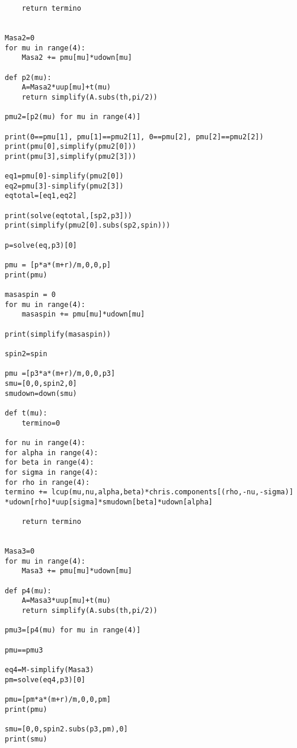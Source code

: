 \begin{verbatim}
    return termino
                        

Masa2=0
for mu in range(4):
    Masa2 += pmu[mu]*udown[mu]

def p2(mu):
    A=Masa2*uup[mu]+t(mu)
    return simplify(A.subs(th,pi/2))

pmu2=[p2(mu) for mu in range(4)]

print(0==pmu[1], pmu[1]==pmu2[1], 0==pmu[2], pmu[2]==pmu2[2])
print(pmu[0],simplify(pmu2[0]))
print(pmu[3],simplify(pmu2[3]))

eq1=pmu[0]-simplify(pmu2[0])
eq2=pmu[3]-simplify(pmu2[3])
eqtotal=[eq1,eq2]

print(solve(eqtotal,[sp2,p3]))
print(simplify(pmu2[0].subs(sp2,spin)))

p=solve(eq,p3)[0]

pmu = [p*a*(m+r)/m,0,0,p]
print(pmu)

masaspin = 0
for mu in range(4):
    masaspin += pmu[mu]*udown[mu]
    
print(simplify(masaspin))

spin2=spin

pmu =[p3*a*(m+r)/m,0,0,p3]
smu=[0,0,spin2,0]
smudown=down(smu)

def t(mu):
    termino=0
    
for nu in range(4):
for alpha in range(4):
for beta in range(4):
for sigma in range(4):
for rho in range(4):
termino += lcup(mu,nu,alpha,beta)*chris.components[(rho,-nu,-sigma)]
*udown[rho]*uup[sigma]*smudown[beta]*udown[alpha]
                        
    return termino
                        

Masa3=0
for mu in range(4):
    Masa3 += pmu[mu]*udown[mu]

def p4(mu):
    A=Masa3*uup[mu]+t(mu)
    return simplify(A.subs(th,pi/2))

pmu3=[p4(mu) for mu in range(4)]

pmu==pmu3

eq4=M-simplify(Masa3)
pm=solve(eq4,p3)[0]

pmu=[pm*a*(m+r)/m,0,0,pm]
print(pmu)

smu=[0,0,spin2.subs(p3,pm),0]
print(smu)
\end{verbatim}